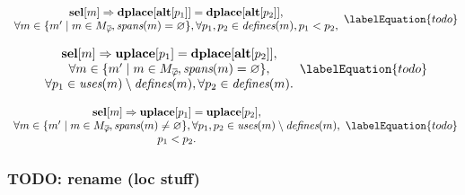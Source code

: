 \begin{equation}
  \begin{array}{c}
    \mVar{sel}[m]
    \mImp
    \mVar{dplace}[\mVar{alt}[p_1]] = \mVar{dplace}[\mVar{alt}[p_2]], \\
    \forall m \in
      \mSetBuilder{m'}%
                  {%
                    m \in \mPhiMatchCompSet \hspace{-1pt},
                    \mSpans(m) = \mEmptySet
                  },
    \forall p_1, p_2 \in \mDefines(m), p_1 < p_2,
  \end{array}
  \labelEquation{todo}
\end{equation}

\begin{equation}
  \begin{array}{c}
    \mVar{sel}[m]
    \mImp
    \mVar{uplace}[p_1] = \mVar{dplace}[\mVar{alt}[p_2]], \\
    \forall m \in
      \mSetBuilder{m'}%
                  {%
                    m \in \mPhiMatchCompSet \hspace{-1pt},
                    \mSpans(m) = \mEmptySet
                  }, \\
    \forall p_1 \in \mUses(m) \setminus \mDefines(m),
    \forall p_2 \in \mDefines(m).
  \end{array}
  \labelEquation{todo}
\end{equation}



\begin{equation}
  \begin{array}{c}
    \mVar{sel}[m] \mImp \mVar{uplace}[p_1] = \mVar{uplace}[p_2], \\
    \forall m \in
      \mSetBuilder{m'}%
                  {%
                    m \in \mPhiMatchCompSet \hspace{-1pt},
                    \mSpans(m) \neq \mEmptySet
                  },
    \forall p_1, p_2 \in \mUses(m) \setminus \mDefines(m), \\
    p_1 < p_2.
  \end{array}
  \labelEquation{todo}
\end{equation}


\subsubsection{TODO: rename (loc stuff)}


